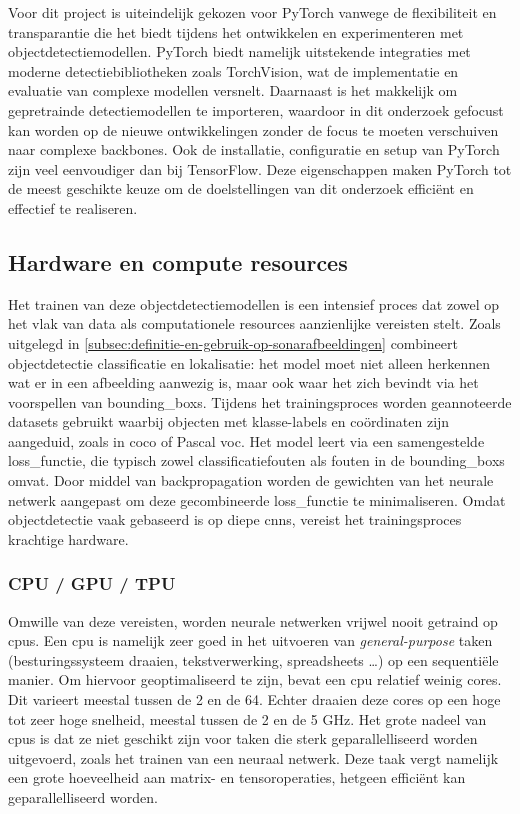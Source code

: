 Voor dit project is uiteindelijk gekozen voor PyTorch vanwege de flexibiliteit en transparantie die het biedt tijdens het ontwikkelen en experimenteren met objectdetectiemodellen. PyTorch biedt namelijk uitstekende integraties met moderne detectiebibliotheken zoals TorchVision, wat de implementatie en evaluatie van complexe modellen versnelt. Daarnaast is het makkelijk om gepretrainde detectiemodellen te importeren, waardoor in dit onderzoek gefocust kan worden op de nieuwe ontwikkelingen zonder de focus te moeten verschuiven naar complexe backbones. Ook de installatie, configuratie en setup van PyTorch zijn veel eenvoudiger dan bij TensorFlow. Deze eigenschappen maken PyTorch tot de meest geschikte keuze om de doelstellingen van dit onderzoek efficiënt en effectief te realiseren.

\subsection{Hardware en compute resources}

Het trainen van deze objectdetectiemodellen is een intensief proces dat zowel op het vlak van data als computationele resources aanzienlijke vereisten stelt. Zoals uitgelegd in \ref{subsec:definitie-en-gebruik-op-sonarafbeeldingen} combineert objectdetectie classificatie en lokalisatie: het model moet niet alleen herkennen wat er in een afbeelding aanwezig is, maar ook waar het zich bevindt via het voorspellen van \glspl{bounding_box}. Tijdens het trainingsproces worden geannoteerde datasets gebruikt waarbij objecten met klasse-labels en coördinaten zijn aangeduid, zoals in \gls{coco} of Pascal \gls{voc}. Het model leert via een samengestelde \gls{loss_functie}, die typisch zowel classificatiefouten als fouten in de \glspl{bounding_box} omvat. Door middel van \gls{backpropagation} worden de gewichten van het neurale netwerk aangepast om deze gecombineerde \gls{loss_functie} te minimaliseren. Omdat objectdetectie vaak gebaseerd is op diepe \glspl{cnn}, vereist het trainingsproces krachtige hardware. \\

\subsubsection{CPU / GPU / TPU}

Omwille van deze vereisten, worden neurale netwerken vrijwel nooit getraind op \glspl{cpu}. Een \gls{cpu} is namelijk zeer goed in het uitvoeren van \emph{general-purpose} taken (besturingssysteem draaien, tekstverwerking, spreadsheets \dots) op een sequentiële manier. Om hiervoor geoptimaliseerd te zijn, bevat een \gls{cpu} relatief weinig cores. Dit varieert meestal tussen de 2 en de 64. Echter draaien deze cores op een hoge tot zeer hoge snelheid, meestal tussen de 2 en de 5 GHz. Het grote nadeel van \glspl{cpu} is dat ze niet geschikt zijn voor taken die sterk geparallelliseerd worden uitgevoerd, zoals het trainen van een neuraal netwerk. Deze taak vergt namelijk een grote hoeveelheid aan matrix- en tensoroperaties, hetgeen efficiënt kan geparallelliseerd worden. \\

